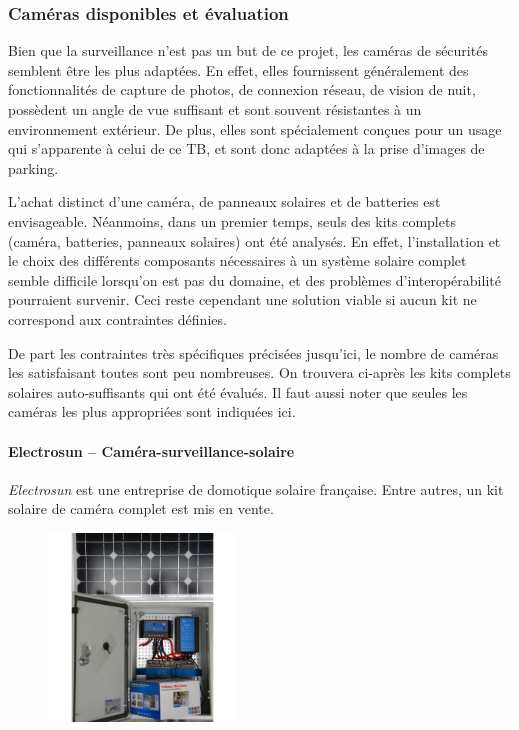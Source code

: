 \subsubsection{Caméras disponibles et évaluation}
Bien que la surveillance n'est pas un but de ce projet, les caméras de sécurités semblent être les plus adaptées. En effet, elles fournissent généralement des fonctionnalités de capture de photos, de connexion réseau, de vision de nuit, possèdent un angle de vue suffisant et sont souvent résistantes à un environnement extérieur. De plus, elles sont spécialement conçues pour un usage qui s'apparente à celui de ce TB, et sont donc adaptées à la prise d'images de parking.

L'achat distinct d'une caméra, de panneaux solaires et de batteries est envisageable. Néanmoins, dans un premier temps, seuls des kits complets (caméra, batteries, panneaux solaires) ont été analysés. En effet, l'installation et le choix des différents composants nécessaires à un système solaire complet semble difficile lorsqu'on est pas du domaine, et des problèmes d'interopérabilité pourraient survenir. Ceci reste cependant une solution viable si aucun kit ne correspond aux contraintes définies.

De part les contraintes très spécifiques précisées jusqu'ici, le nombre de caméras les satisfaisant toutes sont peu nombreuses. On trouvera ci-après les kits complets solaires auto-suffisants qui ont été évalués. Il faut aussi noter que seules les caméras les plus appropriées sont indiquées ici.

\paragraph{\textbf{Electrosun} -- Caméra-surveillance-solaire}
\textit{Electrosun} est une entreprise de domotique solaire française. Entre autres, un kit solaire de caméra complet est mis en vente. \autocite{cam:electrosun_site}

\begin{figure}[ht]
    \includegraphics[width=50mm]{img/conception/electrosun_cam.jpg}
    \centering
\end{figure}

